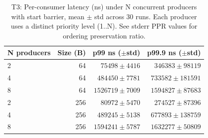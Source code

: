 \begin{table}[!t]
\centering
\caption{T3: Per-consumer latency (ns) under N concurrent producers with start barrier, mean $\pm$ std across 30 runs. Each producer uses a distinct priority level (1..N). See stderr PPR values for ordering preservation ratio.}
\label{tab:priority_t3}
\begin{tabular}{lrrr}
\toprule
\textbf{N producers} & \textbf{Size (B)} & \textbf{p99 ns ($\pm$std)} & \textbf{p99.9 ns ($\pm$std)} \\
\midrule
2 & 64 & $75498 \pm 4416$ & $346383 \pm 98119$ \\
4 & 64 & $484450 \pm 7781$ & $733582 \pm 181591$ \\
8 & 64 & $1526719 \pm 7009$ & $1594827 \pm 87683$ \\
2 & 256 & $80972 \pm 5470$ & $274527 \pm 87396$ \\
4 & 256 & $489245 \pm 5138$ & $677893 \pm 138759$ \\
8 & 256 & $1594241 \pm 5787$ & $1632277 \pm 50809$ \\
\bottomrule
\end{tabular}
\end{table}
